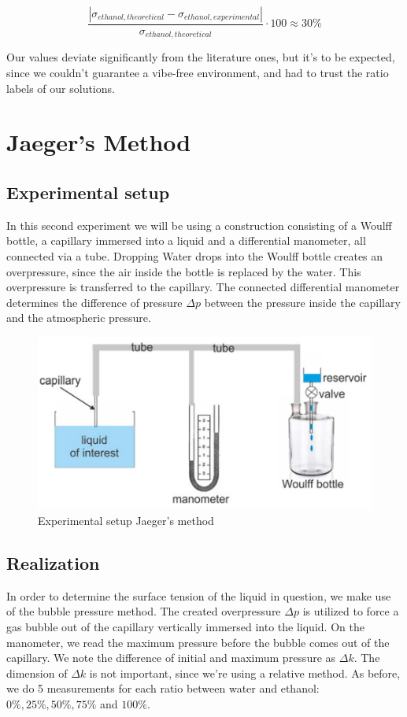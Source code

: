 \documentclass{scrartcl}
\begin{document}
\begin{equation}
    \frac{|\sigma_{ethanol,theoretical}-\sigma_{ethanol,experimental}|}{\sigma_{ethanol,theoretical}} \cdot 100 \approx 30 \%
\end{equation}

Our values deviate significantly from the literature ones, but it's to be expected, since we couldn't guarantee a vibe-free environment, and had to trust the ratio labels of our solutions.

\section{Jaeger's Method}
\subsection{Experimental setup}

In this second experiment we will be using a construction consisting of a Woulff bottle, a capillary immersed into a liquid and a differential manometer, all connected via a tube. Dropping Water drops into the Woulff bottle creates an overpressure, since the air inside the bottle is replaced by the water. This overpressure is transferred to the capillary. The connected differential manometer determines the difference of pressure $\Delta p$ between the pressure inside the capillary and the atmospheric pressure.

\begin{figure}[h]
   \centering
    \includegraphics[scale=0.5]{TP6_Setup_Jaergers_Method.PNG}
    \caption{Experimental setup Jaeger's method}
    \label{fig:4}
\end{figure}



\subsection{Realization}
In order to determine the surface tension of the liquid in question, we make use of the bubble pressure method. The created overpressure $\Delta p$ is utilized to force a gas bubble out of the capillary vertically immersed into the liquid. 
On the manometer, we read the maximum pressure before the bubble comes out of the capillary. We note the difference of initial and maximum pressure as $\Delta k$. The dimension of $\Delta k$ is not important, since we're using a relative method. As before, we do 5 measurements for each ratio between water and ethanol:$0\%, 25\%, 50\%, 75\%$ and $100\%$.
\end{document}
